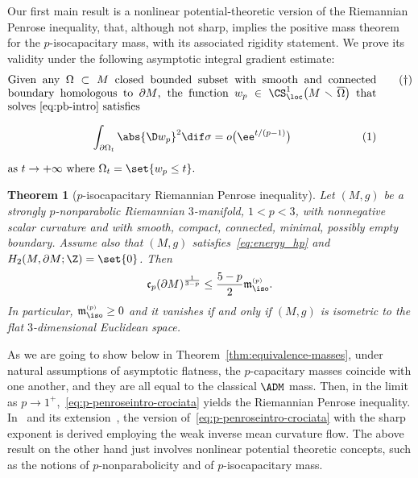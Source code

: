 \documentclass[10pt,a4paper]{amsart}
\makeatletter
\numberwithin{equation}{section}
\newtheorem{Theorem}{Theorem}[section]
\newcommand{\leqnmode}{\tagsleft@true}
\renewcommand{\ncapa}{\mathfrak{c}}
\newcommand{\ma}{\mathfrak{m}}
\newcommand{\tp}[1][p]{{\text{\tiny$(#1)$}}}
\makeatother
\begin{document}
Our first main result is a nonlinear potential-theoretic version of the Riemannian Penrose inequality, that, although not sharp, implies the positive mass theorem for the $p$-isocapacitary mass, with its associated rigidity statement. We prove its validity under the following asymptotic integral gradient estimate:
\bgroup\leqnmode
\begin{equation*}
\begin{minipage}[t]{.9585\textwidth}%
Given any $\Omega \subset M$ closed bounded subset with smooth and connected boundary homologous to $\partial M$, the function $w_p\in \CS^1_{\loc}\big(M \smallsetminus \overline{\Omega}\big)$ that solves~\eqref{eq:pb-intro} satisfies
\begin{gather*}
\int_{\partial \Omega_t} \abs{ \D w_p}^2 \dif \sigma = o\bigl(\ee^{t/(p-1)}\bigr)
\end{gather*}
as $t \to +\infty$ where $\Omega_t= \set{ w_p \leq t}$.
\end{minipage}\tag{$\dag$}\label{eq:energy_hp}
\end{equation*}
\egroup

\begin{Theorem}[$p$-isocapacitary Riemannian Penrose inequality]
\label{thm:pmt-intro}
 Let $(M,g)$ be a strongly $p$-nonparabolic Riemannian $3$-manifold, $1<p<3$, with nonnegative scalar curvature and with smooth, compact, connected, minimal, possibly empty boundary. Assume also that $(M,g)$ satisfies~\eqref{eq:energy_hp} and $H_2( M, \partial M; \Z)=\set{0}$. Then
 \begin{equation}
\label{eq:p-penroseintro-crociata}
\ncapa_p(\partial M)^{\frac{1}{3-p}}\leq \frac{5-p}{2}\ma^{\tp}_{\iso}.
\end{equation}
In particular, $\ma^{\tp}_{\iso}\geq 0$ and it vanishes if and only if $(M,g)$ is isometric to the flat $3$-dimensional Euclidean space.
\end{Theorem}
As we are going to show below in Theorem~\ref{thm:equivalence-masses}, under natural assumptions of asymptotic flatness, the $p$-capacitary masses coincide with one another, and they are all equal to the classical $\ADM$ mass. Then, in the limit as $p \to 1^+$,~\eqref{eq:p-penroseintro-crociata} yields the Riemannian Penrose inequality.
In~\cite{bray_capacitysurfacesmanifoldsnonnegative_2008} and its extension~\cite{xiao_harmoniccapacityasymptoticallyflat_2016}, the version of~\eqref{eq:p-penroseintro-crociata} with the sharp exponent is derived employing the weak inverse mean curvature flow. The above result on the other hand just involves nonlinear potential theoretic concepts, such as the notions of $p$-nonparabolicity and of $p$-isocapacitary mass.
\end{document}
